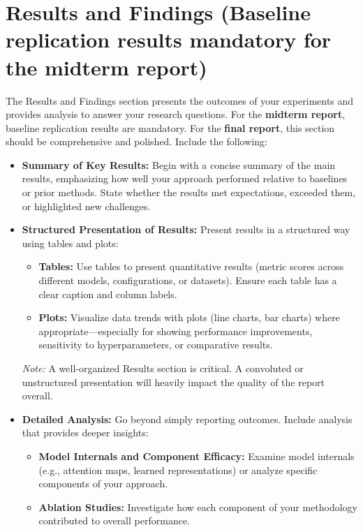 \documentclass{article}
\begin{document}
\section{Results and Findings (Baseline replication results mandatory for the midterm report)}

The Results and Findings section presents the outcomes of your experiments and provides analysis to answer your research questions. For the \textbf{midterm report}, baseline replication results are mandatory. For the \textbf{final report}, this section should be comprehensive and polished. Include the following:

\begin{itemize}
    \item \textbf{Summary of Key Results:} Begin with a concise summary of the main results, emphasizing how well your approach performed relative to baselines or prior methods. State whether the results met expectations, exceeded them, or highlighted new challenges.

    \item \textbf{Structured Presentation of Results:} Present results in a structured way using tables and plots:
    \begin{itemize}
        \item \textbf{Tables:} Use tables to present quantitative results (metric scores across different models, configurations, or datasets). Ensure each table has a clear caption and column labels.
        \item \textbf{Plots:} Visualize data trends with plots (line charts, bar charts) where appropriate---especially for showing performance improvements, sensitivity to hyperparameters, or comparative results.
    \end{itemize}
    \textit{Note:} A well-organized Results section is critical. A convoluted or unstructured presentation will heavily impact the quality of the report overall.

    \item \textbf{Detailed Analysis:} Go beyond simply reporting outcomes. Include analysis that provides deeper insights:
    \begin{itemize}
        \item \textbf{Model Internals and Component Efficacy:} Examine model internals (e.g., attention maps, learned representations) or analyze specific components of your approach.
        \item \textbf{Ablation Studies:} Investigate how each component of your methodology contributed to overall performance.
    \end{itemize}


\end{itemize}
\end{document}
